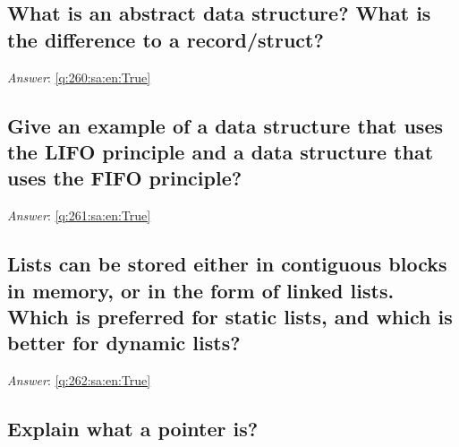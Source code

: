 \documentclass[a4paper,11pt,oneside]{article}
\begin{document}
\begin{sloppypar}
\subsection{What is an abstract data structure? What is the difference to a record/struct?}

\label{q:260:sa:en:False}

\vspace{2cm}

\noindent\makebox[\textwidth]{\hrulefill}

\vspace{1cm}

\textit{Answer}: \autoref{q:260:sa:en:True}



\subsection{Give an example of a data structure that uses the LIFO principle and a data structure that uses the FIFO principle?}

\label{q:261:sa:en:False}

\vspace{2cm}

\noindent\makebox[\textwidth]{\hrulefill}

\vspace{1cm}

\textit{Answer}: \autoref{q:261:sa:en:True}



\subsection{Lists can be stored either in contiguous blocks in memory, or in the form of linked lists. Which is preferred for static lists, and which is better for dynamic lists?}

\label{q:262:sa:en:False}

\vspace{2cm}

\noindent\makebox[\textwidth]{\hrulefill}

\vspace{1cm}

\textit{Answer}: \autoref{q:262:sa:en:True}



\subsection{Explain what a pointer is?}


\end{sloppypar}
\end{document}
